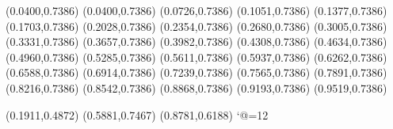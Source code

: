 \PST@Border(0.0400,0.7386)
(0.0400,0.7386)
(0.0726,0.7386)
(0.1051,0.7386)
(0.1377,0.7386)
(0.1703,0.7386)
(0.2028,0.7386)
(0.2354,0.7386)
(0.2680,0.7386)
(0.3005,0.7386)
(0.3331,0.7386)
(0.3657,0.7386)
(0.3982,0.7386)
(0.4308,0.7386)
(0.4634,0.7386)
(0.4960,0.7386)
(0.5285,0.7386)
(0.5611,0.7386)
(0.5937,0.7386)
(0.6262,0.7386)
(0.6588,0.7386)
(0.6914,0.7386)
(0.7239,0.7386)
(0.7565,0.7386)
(0.7891,0.7386)
(0.8216,0.7386)
(0.8542,0.7386)
(0.8868,0.7386)
(0.9193,0.7386)
(0.9519,0.7386)

\PST@Fillcircle(0.1911,0.4872)
\PST@Fillcircle(0.5881,0.7467)
\PST@Fillcircle(0.8781,0.6188)
\catcode`@=12
\fi
\endpspicture
